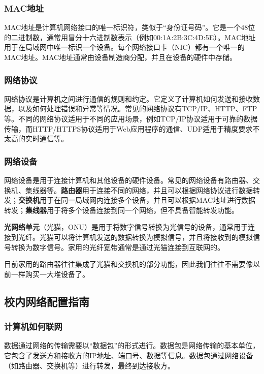 \documentclass[../main.tex]{subfiles}
\begin{document}
\subsubsection{MAC地址}

MAC地址是计算机网络接口的唯一标识符，类似于“身份证号码”。它是一个48位的二进制数，通常用冒分十六进制数表示（例如00:1A:2B:3C:4D:5E）。MAC地址用于在局域网中唯一标识一个设备。每个网络接口卡（NIC）都有一个唯一的MAC地址。MAC地址通常由设备制造商分配，并且在设备的硬件中存储。

\subsubsection{网络协议}

网络协议是计算机之间进行通信的规则和约定。它定义了计算机如何发送和接收数据，以及如何处理错误和异常等情况。常见的网络协议有TCP/IP、HTTP、FTP等。不同的网络协议适用于不同的应用场景，例如TCP/IP协议适用于可靠的数据传输，而HTTP/HTTPS协议适用于Web应用程序的通信、UDP适用于精度要求不太高的实时通信等。

\subsubsection{网络设备}

网络设备是用于连接计算机和其他设备的硬件设备。常见的网络设备有路由器、交换机、集线器等。\textbf{路由器}用于连接不同的网络，并且可以根据网络协议进行数据转发；\textbf{交换机}用于在同一局域网内连接多个设备，并且可以根据MAC地址进行数据转发；\textbf{集线器}用于将多个设备连接到同一个网络，但不具备智能转发功能。

\textbf{光网络单元}（光猫，ONU）是用于将数字信号转换为光信号的设备，通常用于连接到光纤。光猫可以将计算机发送的数据转换为模拟信号，并且将接收到的模拟信号转换为数字信号。家用的光纤宽带通常是通过光猫连接到互联网的。

目前家用的路由器往往集成了光猫和交换机的部分功能，因此我们往往不需要像以前一样购买一大堆设备了。

\subsection{校内网络配置指南}

\subsubsection{计算机如何联网}

数据通过网络的传输需要以“数据包”的形式进行。数据包是网络传输的基本单位，它包含了发送方和接收方的IP地址、端口号、数据等信息。数据包通过网络设备（如路由器、交换机等）进行转发，最终到达接收方。
\end{document}
